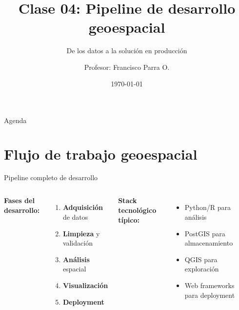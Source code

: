 \documentclass[10pt,aspectratio=169]{beamer}
\title{Clase 04: Pipeline de desarrollo geoespacial}
\subtitle{De los datos a la solución en producción}
\author{Profesor: Francisco Parra O.}
\institute{USACH - Ingeniería Civil en Informática}
\date{\today}
\begin{document}
\maketitle

\begin{frame}{Agenda}
    \tableofcontents[hideallsubsections]
\end{frame}

\section{Flujo de trabajo geoespacial}

\begin{frame}{Pipeline completo de desarrollo}
    \begin{columns}[T]
        \textbf{Fases del desarrollo:}
        \begin{enumerate}
            \item \textbf{Adquisición} de datos
            \item \textbf{Limpieza} y validación
            \item \textbf{Análisis} espacial
            \item \textbf{Visualización}
            \item \textbf{Deployment}
        \end{enumerate}
        
        \vspace{0.3cm}
        \textbf{Stack tecnológico típico:}
        \begin{itemize}
            \item Python/R para análisis
            \item PostGIS para almacenamiento
            \item QGIS para exploración
            \item Web frameworks para deployment
        \end{itemize}
        
        \begin{center}
\end{center}
\end{columns}
\end{frame}
\end{document}
